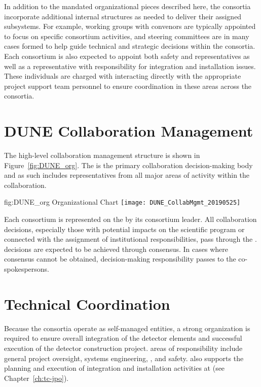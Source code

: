 In addition to the mandated organizational pieces described here, 
the consortia incorporate additional internal structures as needed 
to deliver their assigned subsystems.  For example, working groups 
with convenors are typically appointed to focus on specific consortium 
activities, and steering committees are in many cases formed to help 
guide technical and strategic decisions within the consortia.  Each 
consortium is also expected to appoint both safety and  
representatives as well as a representative with responsibility for 
integration and installation issues.  These individuals are charged 
with interacting directly with the appropriate project support team 
personnel to ensure coordination in these areas across the consortia.        

\section{DUNE Collaboration Management}
\label{sec:dune_mgmt}

The high-level  collaboration management structure is 
shown in Figure~\ref{fig:DUNE_org}.  The   is 
the primary collaboration decision-making body and as such includes 
representatives from all major areas of activity within the 
collaboration.
\begin{dunefigure}{fig:DUNE_org}
  { Organizational Chart}
  \texttt{[image: DUNE\_CollabMgmt\_20190525]}
\end{dunefigure}

Each consortium is represented on the   by its 
consortium leader.  All collaboration decisions, especially those with 
potential impacts on the  scientific program or connected 
with the assignment of institutional responsibilities, pass through the 
.   decisions are expected to be achieved through 
consensus.  In cases where consensus cannot be obtained, decision-making 
responsibility passes to the co-spokespersons.

\section{Technical Coordination}
\label{sec:tc}

Because the consortia operate as self-managed entities, a strong
 organization is required to ensure overall integration 
of the detector elements and successful execution of the detector
construction project.   areas of responsibility include 
general project oversight, systems engineering, , and 
safety.   also supports the planning and execution 
of integration and installation activities at  (see 
Chapter~\ref{ch:tc-jpo}).  


